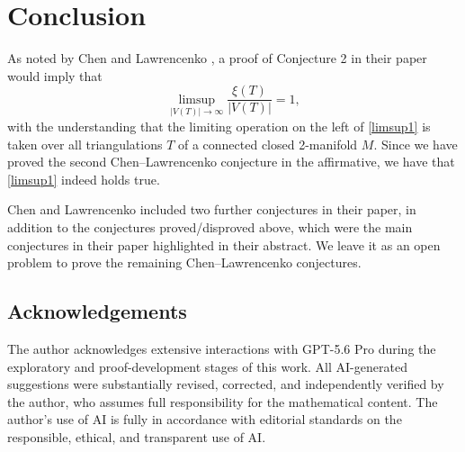 \documentclass[12pt]{article}
\begin{document}
\section{Conclusion}
 As noted by Chen and Lawrencenko \cite{ChenLawrencenko1999}, a proof of Conjecture 2 in their paper would imply that 	
\begin{equation}\label{limsup1} 
 \limsup_{\left| V(T) \right| \to \infty} \frac{\xi(T)}{\left| V(T) \right|} = 1, 
\end{equation}
 with the understanding that the limiting operation on the left of \eqref{limsup1} is taken over all triangulations $T$ of a connected closed 
 2-manifold $M$. Since we have proved the second Chen--Lawrencenko conjecture in the affirmative, 
 we have that \eqref{limsup1} indeed holds true. 

 Chen and Lawrencenko \cite{ChenLawrencenko1999} included two further conjectures in their paper, in addition to the conjectures
 proved/disproved above, 
 which were the main conjectures in their paper highlighted in their abstract.
 We leave it as an open problem to prove the remaining Chen--Lawrencenko conjectures. 

\subsection*{Acknowledgements}
 The author acknowledges extensive interactions with GPT-5.6 Pro during the exploratory and proof-development stages of this work. All 
 AI-generated suggestions were substantially revised, corrected, and independently verified by the author, who assumes full responsibility 
 for the mathematical content. The author's use of AI is fully in accordance with editorial standards on the responsible, ethical, and 
 transparent use of AI. 



\end{document}

